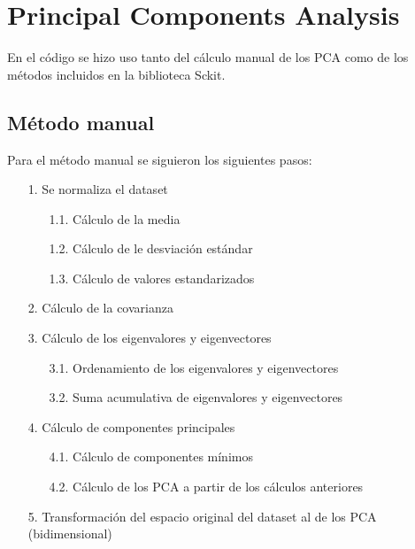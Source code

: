 \section[PCA]{Principal Components Analysis}
En el código se hizo uso tanto del cálculo manual de los PCA como de los métodos incluidos en la biblioteca Sckit.

\subsection[Manual]{Método manual}
Para el método manual se siguieron los siguientes pasos:
\begin{itemize}
    \item[1.] Se normaliza el dataset
    \begin{itemize}
        \item[1.1.] Cálculo de la media
        \item[1.2.] Cálculo de le desviación estándar
        \item[1.3.] Cálculo de valores estandarizados
    \end{itemize}
    \item[2.] Cálculo de la covarianza
    \item[3.] Cálculo de los eigenvalores y eigenvectores
    \begin{itemize}
        \item[3.1.] Ordenamiento de los eigenvalores y eigenvectores
        \item[3.2.] Suma acumulativa de eigenvalores y eigenvectores
    \end{itemize}
    \item[4.] Cálculo de componentes principales
    \begin{itemize}
        \item[4.1.] Cálculo de componentes mínimos
        \item[4.2.] Cálculo de los PCA a partir de los cálculos anteriores
    \end{itemize}
    \item[5.] Transformación del espacio original del dataset al de los PCA (bidimensional)
\end{itemize}

